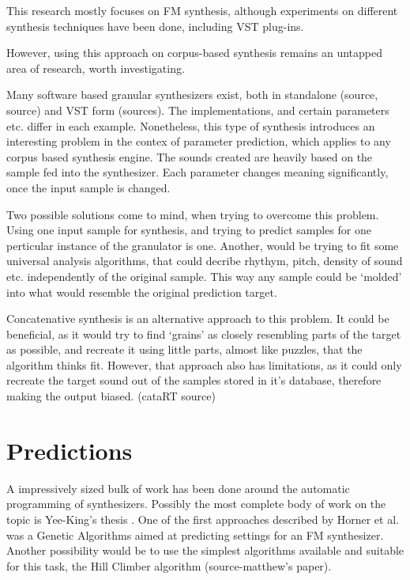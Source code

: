 This research mostly focuses on FM
synthesis\cite{horner_machine_1993}, although experiments on different
synthesis techniques have been done\cite{dahlstedt_creating_nodate},
including VST plug-ins\cite{yee-king_synthbot:_nodate}.

However, using this approach on corpus-based synthesis remains an
untapped area of research, worth
investigating\cite{mcdonald_neural_2017}.

Many software based granular synthesizers exist, both in standalone
(source, source) and VST form (sources). The implementations, and
certain parameters etc. differ in each example. Nonetheless, this type
of synthesis introduces an interesting problem in the contex of
parameter prediction, which applies to any corpus based synthesis
engine. The sounds created are heavily based on the sample fed into
the synthesizer. Each parameter changes meaning significantly, once
the input sample is changed. 

Two possible solutions come to mind, when trying to overcome this
problem. Using one input sample for synthesis, and trying
to predict samples for one perticular instance of the granulator is one.
Another, would be trying to fit some universal analysis algorithms,
that could decribe rhythym, pitch, density of sound etc. independently
of the original sample. This way any sample could be `molded' into
what would resemble the original prediction target. 

Concatenative synthesis is an alternative approach to this problem. It
could be beneficial, as it would try to find `grains' as closely
resembling parts of the target as possible, and recreate it using
little parts, almost like puzzles, that the algorithm thinks
fit. However, that approach also has limitations, as it could only
recreate the target sound out of the samples stored in it's database,
therefore making the output biased. (cataRT source)

\section{Predictions}

A impressively sized bulk of work has been done around the automatic
programming of synthesizers. Possibly the most complete body of work
on the topic is Yee-King's thesis
\cite{yee-king_automatic_nodate}. One of the first approaches
described by Horner et al. was a Genetic Algorithms \cite{horner_machine_1993}
aimed at predicting settings for an FM synthesizer. Another
possibility would be to use the simplest algorithms available and
suitable for this task, the Hill Climber algorithm (source-matthew's
paper).

